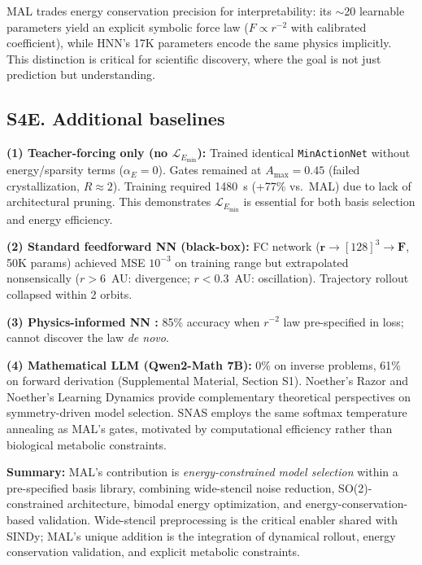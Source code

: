 \documentclass[aps,pre,reprint,superscriptaddress]{revtex4-2}
\begin{document}
MAL trades energy conservation precision for interpretability: its $\sim$20 learnable parameters yield an explicit symbolic force law ($F \propto r^{-2}$ with calibrated coefficient), while HNN's 17K parameters encode the same physics implicitly. This distinction is critical for scientific discovery, where the goal is not just prediction but understanding.

\subsection{S4E. Additional baselines}

\textbf{(1) Teacher-forcing only (no $\mathcal{L}_{E_{\min}}$):}
Trained identical \texttt{MinActionNet} without energy/sparsity terms ($\alpha_E = 0$). Gates remained at $A_{\max} = 0.45$ (failed crystallization, $R \approx 2$). Training required 1480~s (+77\% vs.\ MAL) due to lack of architectural pruning. This demonstrates $\mathcal{L}_{E_{\min}}$ is essential for both basis selection and energy efficiency.

\textbf{(2) Standard feedforward NN (black-box):}
FC network ($\mathbf{r} \to [128]^3 \to \mathbf{F}$, 50K params) achieved MSE $10^{-3}$ on training range but extrapolated nonsensically ($r > 6$~AU: divergence; $r < 0.3$~AU: oscillation). Trajectory rollout collapsed within 2 orbits.

\textbf{(3) Physics-informed NN \cite{Raissi2019}:}
85\% accuracy when $r^{-2}$ law pre-specified in loss; cannot discover the law \textit{de novo}.

\textbf{(4) Mathematical LLM (Qwen2-Math 7B):}
0\% on inverse problems, 61\% on forward derivation (Supplemental Material, Section S1). Noether's Razor \cite{vanderOuderaa2024} and Noether's Learning Dynamics \cite{Tanaka2021} provide complementary theoretical perspectives on symmetry-driven model selection. SNAS \cite{Xie2019SNAS} employs the same softmax temperature annealing as MAL's gates, motivated by computational efficiency rather than biological metabolic constraints.

\textbf{Summary:} MAL's contribution is \textit{energy-constrained model selection} within a pre-specified basis library, combining wide-stencil noise reduction, SO(2)-constrained architecture, bimodal energy optimization, and energy-conservation-based validation. Wide-stencil preprocessing is the critical enabler shared with SINDy; MAL's unique addition is the integration of dynamical rollout, energy conservation validation, and explicit metabolic constraints.
\end{document}
